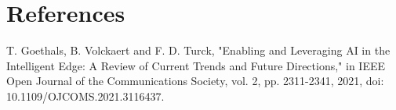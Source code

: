 \documentclass[conference]{IEEEtran}
\begin{document}
\section*{References}

\begin{thebibliography}{00}
 T. Goethals, B. Volckaert and F. D. Turck, "Enabling and Leveraging AI in the Intelligent Edge: A Review of Current Trends and Future Directions," in IEEE Open Journal of the Communications Society, vol. 2, pp. 2311-2341, 2021, doi: 10.1109/OJCOMS.2021.3116437.

\end{thebibliography}
\vspace{12pt}
\end{document}
